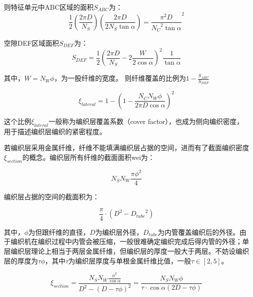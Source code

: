 则特征单元中ABC区域的面积$ S_{ABC} $为：
\begin{equation}
\frac{1}{2}\left( {\frac{{2\pi D}}{{{N_S}}}} \right)\left( {\frac{{2\pi D}}{{2{N_S}\tan \alpha }}} \right) = {\frac{{{\pi ^2}D}}{{{N_C}^2\tan \alpha }}^2}
\end{equation}


空隙DEF区域面积$ S_{DEF} $为：
\begin{equation}
\label{eq:area-of-gaps}
S_{DEF}=\frac{1}{2}{\left( {\frac{{2\pi D}}{{{N_S}}} - 2\frac{W}{{2\cos \alpha }}} \right)^2}\frac{1}{{\tan \alpha }}
\end{equation}


其中，$ W = {N_W}\phi  $，为一股纤维的宽度。
则纤维覆盖的比例为$ 1 - \frac{{{S_{ABC}}}}{{{S_{DEF}}}} $


\begin{equation}
\xi_{lateral} = 1 - {\left( {1 - \frac{{{N_C}{N_W}\phi }}{{2\pi D\cos \alpha }}} \right)^2}
\end{equation}

这个比例$ \xi_{lateral}  $一般称为编织层覆盖系数（cover factor），也成为侧向编织密度，用于描述编织层编织的紧密程度。



若编织层采用金属纤维，纤维不能填满编织层占据的空间，进而有了截面编织密度$ \xi_{section} $的概念。编织层所有纤维的截面面积wei为：

\begin{equation}
{N_S}{N_W}\frac{{\pi {\phi ^2}}}{4}
\end{equation}

编织层占据的空间的截面积为：

\begin{equation}
\frac{\pi }{4}\cdot({D^2} - {D_{tube}}^2)
\end{equation}

其中，$ \phi $为但跟纤维的直径，$ D $为编织层外径，$ D_{tube} $为内管覆盖编织后的外径。由于编织机在编织过程中内管会被压缩，一般很难确定编织完成后得内管的外径；单层编织层理论上相当于两层金属纤维，但编织层的厚度一般大于两层。不妨设编织层的厚度为$ \tau\phi $，其中$ \tau $为编织层厚度与单根金属纤维比值，一般$ \tau  \in \left[ {2,5} \right]$。


\begin{equation}
\label{eq:section-epsilon}
{\xi _{section}} = \frac{{{N_S}{N_W}\frac{{{\phi ^2}}}{{\cos \alpha }}}}{{{D^2} - {{\left( {D - \tau \phi } \right)}^2}}} = \frac{{{N_S}{N_W}\phi }}{{\tau  \cdot \cos \alpha (2D - \tau \phi )}}
\end{equation}


